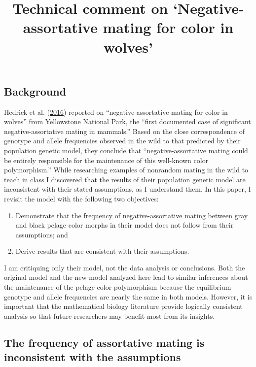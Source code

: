 \documentclass[
]{article}
\title{Technical comment on `Negative-assortative mating for color in wolves'}
\author{}
\date{\vspace{-2.5em}}
\providecommand{\tightlist}{%
  \setlength{\itemsep}{0pt}\setlength{\parskip}{0pt}}
\begin{document}
\maketitle

\hypertarget{background}{%
\subsection{Background}\label{background}}

Hedrick et al. (\protect\hyperlink{ref-hedrick_negative-assortative_2016}{2016}) reported on ``negative-assortative mating for color in wolves'' from Yellowstone National Park, the ``first documented case of significant negative-assortative mating in mammals.'' Based on the close correspondence of genotype and allele frequencies observed in the wild to that predicted by their population genetic model, they conclude that ``negative-assortative mating could be entirely responsible for the maintenance of this well-known color polymorphism.'' While researching examples of nonrandom mating in the wild to teach in class I discovered that the results of their population genetic model are inconsistent with their stated assumptions, as I understand them. In this paper, I revisit the model with the following two objectives:

\begin{enumerate}
\def\labelenumi{\arabic{enumi}.}
\tightlist
\item
  Demonstrate that the frequency of negative-assortative mating between gray and black pelage color morphs in their model does not follow from their assumptions; and
\item
  Derive results that are consistent with their assumptions.
\end{enumerate}

I am critiquing only their model, not the data analysis or conclusions. Both the original model and the new model analyzed here lead to similar inferences about the maintenance of the pelage color polymorphism because the equilibrium genotype and allele frequencies are nearly the same in both models. However, it is important that the mathematical biology literature provide logically consistent analysis so that future researchers may benefit most from its insights.

\hypertarget{the-frequency-of-assortative-mating-is-inconsistent-with-the-assumptions}{%
\subsection{The frequency of assortative mating is inconsistent with the assumptions}\label{the-frequency-of-assortative-mating-is-inconsistent-with-the-assumptions}}
\end{document}
